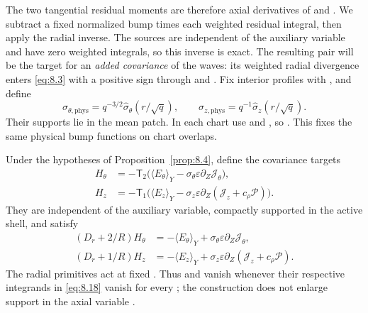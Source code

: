 The two tangential residual moments are therefore axial derivatives of
 and
. We subtract a fixed normalized bump times
each weighted residual integral, then apply the radial inverse. The sources are independent of the
auxiliary variable and have zero weighted integrals, so this inverse is exact. The resulting pair will
be the target for an \emph{added covariance} of the waves: its weighted radial divergence enters
\eqref{eq:8.3} with a positive sign through  and
. Fix interior profiles
 with
, and define
\[
\sigma_{\theta,\mathrm{phys}}=q^{-3/2}\widehat\sigma_\theta(r/\sqrt q),
\qquad
\sigma_{z,\mathrm{phys}}=q^{-1}\widehat\sigma_z(r/\sqrt q).
\]
Their supports lie in the mean patch. In each chart use
 and
, so
. This fixes the same physical
bump functions on chart overlaps.
%
\begin{corollary}\label{cor:8.5}
Under the hypotheses of Proposition~\ref{prop:8.4}, define the covariance targets
\begin{equation}
\begin{aligned}
H_\theta&=-\mathsf T_2\bigl(\langle E_\theta\rangle_Y
  -\sigma_\theta\varepsilon\partial_Z\mathcal J_\theta\bigr),\\
H_z&=-\mathsf T_1\bigl(\langle E_z\rangle_Y
  -\sigma_z\varepsilon\partial_Z(\mathcal J_z+c_\rho\mathcal P)\bigr).
\end{aligned}
\tag{8.18}\label{eq:8.18}
\end{equation}
They are independent of the auxiliary variable, compactly supported in the active shell, and satisfy
\begin{align*}
(D_r+2/R)H_\theta&=-\langle E_\theta\rangle_Y
  +\sigma_\theta\varepsilon\partial_Z\mathcal J_\theta,\\
(D_r+1/R)H_z&=-\langle E_z\rangle_Y
  +\sigma_z\varepsilon\partial_Z(\mathcal J_z+c_\rho\mathcal P).
\end{align*}
The radial primitives act at fixed . Thus
 and  vanish whenever their respective
integrands in \eqref{eq:8.18} vanish for every ; the construction does not
enlarge support in the axial variable .
\end{corollary}

